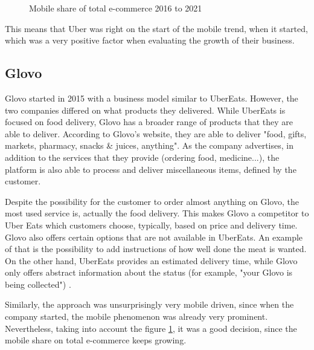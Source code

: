 \begin{figure}[ht]
\centering
{}
\caption{Mobile share of total e-commerce 2016 to 2021}
\label{fig:mobileGrowth}
\end{figure}

This means that Uber was right on the start of the mobile trend, when it started, which was a very positive factor when evaluating the growth of their business.

\subsection{Glovo}

Glovo started in 2015 with a business model similar to UberEats. However, the two companies differed on what products they delivered. While UberEats is focused on food delivery, Glovo has a broader range of products that they are able to deliver. According to Glovo's website, they are able to deliver "food, gifts, markets, pharmacy, snacks \& juices, anything". As the company advertises, in addition to the services that they provide (ordering food, medicine...), the platform is also able to process and deliver miscellaneous items, defined by the customer. 
\par
Despite the possibility for the customer to order almost anything on Glovo, the most used service is, actually the food delivery. This makes Glovo a competitor to Uber Eats which customers choose, typically, based on price and delivery time. Glovo also offers certain options that are not available in UberEats. An example of that is the possibility to add instructions of how well done the meat is wanted. On the other hand, UberEats provides an estimated delivery time, while Glovo only offers abstract information about the status (for example, "your Glovo is being collected") \parencite{uberVsGlovo}.
\par
Similarly, the approach was unsurprisingly very mobile driven, since when the company started, the mobile phenomenon was already very prominent. Nevertheless, taking into account the figure \ref{fig:mobileGrowth}, it was a good decision, since the mobile share on total e-commerce keeps growing.

